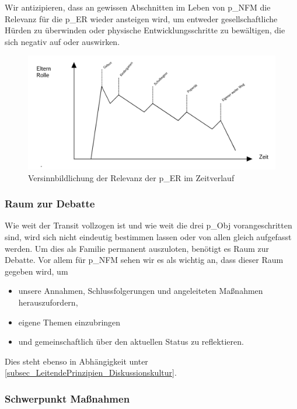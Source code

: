 Wir antizipieren, dass an gewissen Abschnitten im Leben von \gls{p_NFM} die Relevanz für die \gls{p_ER} wieder ansteigen wird, um entweder gesellschaftliche Hürden zu überwinden oder physische Entwicklungsschritte zu bewältigen, die sich negativ auf  oder \NFMOTwo auswirken.

\begin{figure}[H]
	\centering
	\includegraphics[scale = 0.3]{attachment/chapter_OWN/Scc005.png}
	\caption{Versinnbildlichung der Relevanz der \gls{p_ER} im Zeitverlauf}
\end{figure} 

\subsubsection{Raum zur Debatte} 
Wie weit der Transit vollzogen ist und wie weit die drei \gls{p_Obj} vorangeschritten sind, wird sich nicht eindeutig bestimmen lassen oder von allen gleich aufgefasst werden. Um dies als Familie permanent auszuloten, benötigt es Raum zur Debatte. Vor allem für \gls{p_NFM} sehen wir es als wichtig an, dass dieser Raum gegeben wird, um
\begin{itemize}
	\item unsere Annahmen, Schlussfolgerungen und angeleiteten Maßnahmen herauszufordern, 
	\item eigene Themen einzubringen
	\item und gemeinschaftlich über den aktuellen Status zu reflektieren.
\end{itemize}

Dies steht ebenso in Abhängigkeit unter \ref{subsec_LeitendePrinzipien_Diskussionskultur}.

\subsubsection{Schwerpunkt Maßnahmen}

